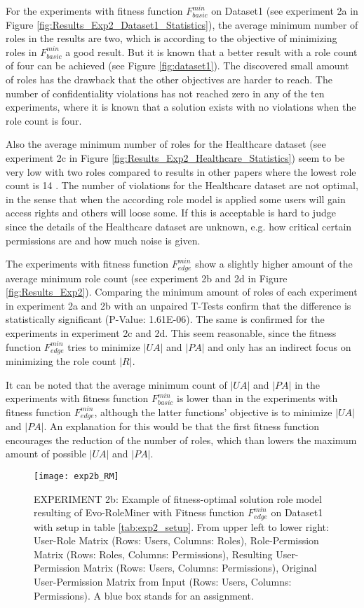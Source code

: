 For the experiments with fitness function $F_{basic}^{min}$ on Dataset1 (see experiment 2a in Figure \ref{fig:Results_Exp2_Dataset1_Statistics}), the average minimum number of roles in the results are two, which is according to the objective of minimizing roles in $F_{basic}^{min}$ a good result. But it is known that a better result with a role count of four can be achieved (see Figure \ref{fig:dataset1}). The discovered small amount of roles has the drawback that the other objectives are harder to reach. The number of confidentiality violations has not reached zero in any of the ten experiments, where it is known that a solution exists with no violations when the role count is four.

Also the average minimum number of roles for the Healthcare dataset (see experiment 2c in Figure \ref{fig:Results_Exp2_Healthcare_Statistics}) seem to be very low with two roles compared to results in other papers where the lowest role count is 14 \cite{Ene}\cite{Molloy:2009:ERM:1542207.1542224}. The number of violations for the Healthcare dataset are not optimal, in the sense that when the according role model is applied some users will gain access rights and others will loose some. If this is acceptable is hard to judge since the details of the Healthcare dataset are unknown, e.g. how critical certain permissions are and how much noise is given.

The experiments with fitness function $F_{edge}^{min}$ show a slightly higher amount of the average minimum role count (see experiment 2b and 2d in Figure \ref{fig:Results_Exp2}). Comparing the minimum amount of roles of each experiment in experiment 2a and 2b with an unpaired T-Tests confirm that the difference is statistically significant (P-Value: 1.61E-06). The same is confirmed for the experiments in experiment 2c and 2d. This seem reasonable, since the fitness function $F_{edge}^{min}$ tries to minimize $|UA|$ and $|PA|$ and only has an indirect focus on minimizing the role count $|R|$.

It can be noted that the average minimum count of $|UA|$ and $|PA|$ in the experiments with fitness function $F_{basic}^{min}$ is lower than in the experiments with fitness function $F_{edge}^{min}$, although the latter functions' objective is to minimize $|UA|$ and $|PA|$. An explanation for this would be that the first fitness function encourages the reduction of the number of roles, which than lowers the maximum amount of possible $|UA|$ and $|PA|$.

\begin{figure}[H]
	\centering
	\texttt{[image: exp2b\_RM]}
	\caption{EXPERIMENT 2b: Example of fitness-optimal solution role model resulting of Evo-RoleMiner with Fitness function $F_{edge}^{min}$ on Dataset1 with setup in table \ref{tab:exp2_setup}. From upper left to lower right: User-Role Matrix (Rows: Users, Columns: Roles), Role-Permission Matrix (Rows: Roles, Columns: Permissions), Resulting User-Permission Matrix (Rows: Users, Columns: Permissions), Original User-Permission Matrix from Input (Rows: Users, Columns: Permissions). A blue box stands for an assignment.}
	\label{fig:exp2b_RM}
\end{figure}

